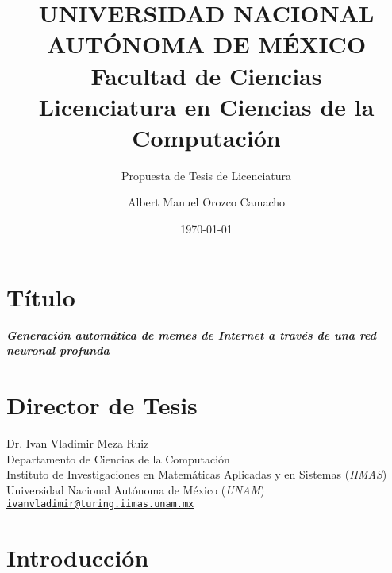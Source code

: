 \documentclass[paper=letter, fontsize=10pt]{scrartcl}
\title{
  \normalsize
  UNIVERSIDAD NACIONAL AUTÓNOMA DE MÉXICO\\
  Facultad de Ciencias\\
  Licenciatura en Ciencias de la Computación
}
\subtitle{\normalsize Propuesta de Tesis de Licenciatura}
\author{\normalsize Albert Manuel Orozco Camacho}
\date{\normalsize \today}
\begin{document}
\maketitle

\section*{Título}

\noindent
\emph{\textbf{Generación automática de memes de Internet a través de una red neuronal profunda}}

\section*{Director de Tesis}

\thispagestyle{empty}
\noindent
Dr. Ivan Vladimir Meza Ruiz\\
Departamento de Ciencias de la Computación\\
Instituto de Investigaciones en Matemáticas Aplicadas y en Sistemas (\emph{IIMAS})\\
Universidad Nacional Autónoma de México (\emph{UNAM})\\
\texttt{\href{mailto:ivanvladimir@turing.iimas.unam.mx}{ivanvladimir@turing.iimas.unam.mx}}

\section*{Introducción}
\end{document}
